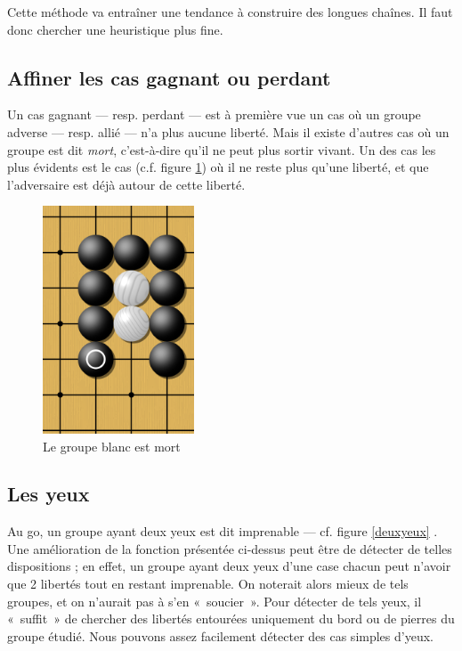 \documentclass[11pt,a4paper,titlepage,french]{article}
\begin{document}
			Cette méthode va entraîner une tendance à construire des longues chaînes. Il faut donc chercher une heuristique plus fine.

		\subsection{Affiner les cas gagnant ou perdant}
			Un cas gagnant --- resp. perdant --- est à première vue un cas où un groupe adverse --- resp. allié --- n'a plus aucune liberté. Mais il existe d'autres cas où un groupe est dit \emph{mort}, c'est-à-dire qu'il ne peut plus sortir vivant. Un des cas les plus évidents est le cas (c.f. figure \ref{groupemort}) où il ne reste plus qu'une liberté, et que l'adversaire est déjà autour de cette liberté.

			\begin{figure}[hbt]
			\label{groupemort}
			\begin{center}
			\includegraphics[width=0.4\textwidth]{groupemort.png}
			\end{center}
			\caption{Le groupe blanc est mort}

			\end{figure}

		\subsection{Les yeux}
			Au go, un groupe ayant deux yeux est dit imprenable --- cf. figure \ref{deuxyeux} . Une amélioration de la fonction présentée ci-dessus peut être de détecter de telles dispositions ; en effet, un groupe ayant deux yeux d'une case chacun peut n'avoir que 2 libertés tout en restant imprenable. On noterait alors mieux de tels groupes, et on n'aurait pas à s'en «~soucier~». Pour détecter de tels yeux, il «~suffit~» de chercher des libertés entourées uniquement du bord ou de pierres du groupe étudié. Nous pouvons assez facilement détecter des cas simples d'yeux.
\end{document}
